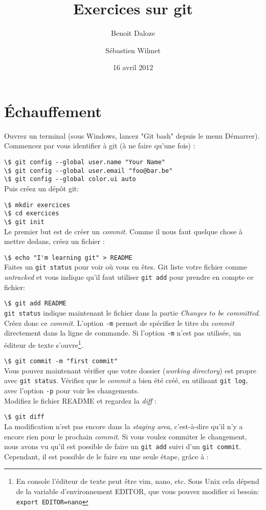 \documentclass[a4paper,11pt]{article}
\title{Exercices sur git}
\author{Benoit Daloze \and Sébastien Wilmet}
\date{16 avril 2012}
\newcommand{\code}[1]{\lstinline{#1}}
\newcommand{\shell}[1]{\hspace*{1cm}\lstinline{\$ #1}\\}
\begin{document}
\maketitle

\section{Échauffement}

Ouvrez un terminal (sous Windows, lancez "Git bash" depuis le menu Démarrer).
Commencez par vous identifier à git (à ne faire qu'une fois) :

\shell{git config --global user.name "Your Name"}
\shell{git config --global user.email "foo@bar.be"}
\shell{git config --global color.ui auto}

Puis créez un dépôt git:

\shell{mkdir exercices}
\shell{cd exercices}
\shell{git init}

Le premier but est de créer un \textit{commit}. Comme il nous faut quelque chose à mettre dedans, créez un fichier :

\shell{echo "I'm learning git" > README}

Faites un \code{git status} pour voir où vous en êtes.
Git liste votre fichier comme \emph{untracked} et vous indique qu'il faut utiliser \code{git add} pour prendre en compte ce fichier:

\shell{git add README}

\code{git status} indique maintenant le fichier dans la partie \emph{Changes to be committed}.
Créez donc ce \emph{commit}. L'option \code{-m} permet de spécifier le titre du \emph{commit} directement dans la ligne de commande. Si l'option \code{-m} n'est pas utilisée, un éditeur de texte s'ouvre\footnote{En console l'éditeur de texte peut être vim, nano, etc. Sous Unix cela dépend de la variable d'environnement EDITOR, que vous pouvez modifier si besoin: \code{export EDITOR=nano}}.

\shell{git commit -m "first commit"}

Vous pouvez maintenant vérifier que votre dossier (\emph{working directory}) est propre avec \code{git status}.
Vérifiez que le \emph{commit} a bien été créé, en utilisant \code{git log}, avec l'option \code{-p} pour voir les changements. \\

Modifiez le fichier README et regardez la \textit{diff} :

\shell{git diff}

La modification n'est pas encore dans la \textit{staging area}, c'est-à-dire qu'il n'y a encore rien pour le prochain \emph{commit}. Si vous voulez commiter le changement, nous avons vu qu'il est possible de faire un \code{git add} suivi d'un \code{git commit}. Cependant, il est possible de le faire en une seule étape, grâce à :
\end{document}
